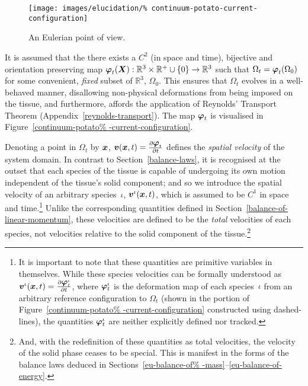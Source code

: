\begin{figure}
  \centering
  \texttt{[image: images/elucidation/\%
    continuum-potato-current-configuration]}
  \caption{An Eulerian point of view.}
  \label{continuum-potato-current-configuration}
\end{figure}

It is assumed that the there exists a {$\mathit{C}^{2}$} (in space and
time), bijective and orientation preserving map $\mbox{\boldmath$\varphi$}_{t}(\mbox{\boldmath$ X$}):
\mathbb{R}^3\times\mathbb{R}^{+}\cup\{0\} \rightarrow\mathbb{R}^{3}$
such that $\Omega_{t} = \mbox{\boldmath$\varphi$}_{t} (\Omega_{0})$ for some
convenient, {\em fixed} subset of $\mathbb{R}^{3}$, $\Omega_{0}$. This
ensures that $\Omega_{t}$ evolves in a well-behaved manner,
disallowing non-physical deformations from being imposed on the
tissue, and furthermore, affords the application of Reynolds'
Transport Theorem (Appendix~\ref{reynolds-transport}). The map
$\mbox{\boldmath$\varphi$}_{t}$ is visualised in Figure~\ref{continuum-potato%
-current-configuration}.

Denoting a point in $\Omega_{t}$ by $\mbox{\boldmath$ x$}$, $\mbox{\boldmath$ v$}(\mbox{\boldmath$ x$},t) =
\frac{\partial \mbox{\boldmath$\varphi$}_{t}}{\partial t}$ defines the {\em spatial
  velocity} of the system domain. In contrast to
Section~\ref{balance-laws}, it is recognised at the outset that each
species of the tissue is capable of undergoing its own motion
independent of the tissue's solid component; and so we introduce the
spatial velocity of an arbitrary species~$\iota$,
$\mbox{\boldmath$ v$}^{\iota}(\mbox{\boldmath$ x$},t)$, which is assumed to be $\mathit{C}^{1}$ in space
and time.\footnote{It is important to note that these quantities are
  primitive variables in themselves. While these species velocities
  can be formally understood as \mbox{$\mbox{\boldmath$ v$}^{\iota}(\mbox{\boldmath$ x$},t) =
    \frac{\partial \mbox{\boldmath$\varphi$}^{\iota}_{t}}{\partial t}$}, where
  $\mbox{\boldmath$\varphi$}^{\iota}_{t}$ is the deformation map of each
  species~$\iota$ from an arbitrary reference configuration to
  $\Omega_{t}$ (shown in the portion of Figure~\ref{continuum-potato%
    -current-configuration} constructed using dashed-lines), the
  quantities $\mbox{\boldmath$\varphi$}^{\iota}_{t}$ are neither explicitly defined nor
  tracked.}  Unlike the corresponding quantities defined in
Section~\ref{balance-of-linear-momentum}, these velocities are defined
to be the {\em total} velocities of each species, not velocities
relative to the solid component of the tissue.\footnote{And, with the
  redefinition of these quantities as total velocities, the velocity
  of the solid phase ceases to be special. This is manifest in the
  forms of the balance laws deduced in Sections~\ref{eu-balance-of%
    -mass}--\ref{eu-balance-of-energy}.}


